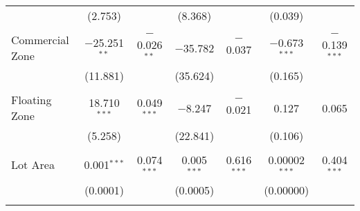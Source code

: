\documentclass[a4paper]{article}
\begin{document}
\begin{table}[!htbp]
\begin{adjustwidth}{0.cm}{-0cm}
\begin{threeparttable}
\begin{tabular}{@{\extracolsep{-2pt}}lcccccc}
  & (2.753) &  & (8.368) & & (0.039) &  \\ 
  & & & & & & \\ 
 Commercial Zone & $-$25.251$^{**}$ & $-$0.026$^{**}$ & $-$35.782 & $-$0.037 & $-$0.673$^{***}$ & $-$0.139$^{***}$ \\ 
  & (11.881) &  & (35.624) &  & (0.165) &  \\ 
  & & & & & & \\ 
 Floating Zone & 18.710$^{***}$ & 0.049$^{***}$ & $-$8.247 & $-$0.021 & 0.127 & 0.065 \\ 
  & (5.258) & & (22.841) & & (0.106) &  \\ 
  & & & & & & \\ 
 Lot Area & 0.001$^{***}$ & 0.074$^{***}$ & 0.005$^{***}$ & 0.616$^{***}$ & 0.00002$^{***}$ & 0.404$^{***}$ \\ 
  & (0.0001) &  & (0.0005) &  & (0.00000) &  \\ 
  & & & & & & \\ 
  

\end{tabular}
\end{threeparttable}
\end{adjustwidth}
\end{table}
\end{document}
